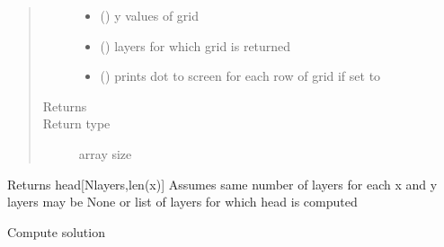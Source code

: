 \documentclass[letterpaper,10pt,english]{sphinxmanual}
\begin{document}
\begin{fulllineitems}
\begin{fulllineitems}
\begin{quote}
\begin{description}
\begin{itemize}
\item {} 
\sphinxstyleliteralstrong{, } (\sphinxstyleliteralemphasis{,}) \textendash{} y values of grid

\item {} 
 (\sphinxstyleliteralemphasis{, }\sphinxstyleliteralemphasis{, }) \textendash{} layers for which grid is returned

\item {} 
 (\sphinxstyleliteralemphasis{, }) \textendash{} prints dot to screen for each row of grid if set to 

\end{itemize}

\item[{Returns}] \leavevmode
{}

\item[{Return type}] \leavevmode
array size 

\end{description}\end{quote}

\end{fulllineitems}


\begin{fulllineitems}
\label{\detokenize{models/model:timml.model.Model.headalongline}}
Returns head{[}Nlayers,len(x){]}
Assumes same number of layers for each x and y
layers may be None or list of layers for which head is computed

\end{fulllineitems}


\begin{fulllineitems}
\label{\detokenize{models/model:timml.model.Model.solve}}
Compute solution


\end{fulllineitems}
\end{fulllineitems}
\end{document}
